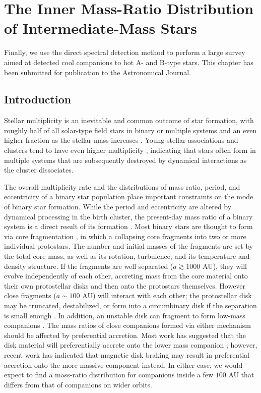 
\chapter{The Inner Mass-Ratio Distribution of Intermediate-Mass Stars}
\label{chap:survey}

Finally, we use the direct spectral detection method to perform a large survey aimed at detected cool companions to hot A- and B-type stars. This chapter has been submitted for publication to the Astronomical Journal.



\section{Introduction}
\label{paper6_sec:intro}

Stellar multiplicity is an inevitable and common outcome of star formation, with roughly half of all solar-type field stars in binary or multiple systems \citep{Raghavan2010} and an even higher fraction as the stellar mass increases \citep{Zinnecker2007}. Young stellar associations and clusters tend to have even higher multiplicity \citep{Duchene2013}, indicating that stars often form in multiple systems that are subsequently destroyed by dynamical interactions as the cluster dissociates. 

The overall multiplicity rate and the distributions of mass ratio, period, and eccentricity of a binary star population place important constraints on the mode of binary star formation. While the period and eccentricity are altered by dynamical processing in the birth cluster, the present-day mass ratio of a binary system is a direct result of its formation \citep{Parker2013}. Most binary stars are thought to form via core fragmentation \citep{Boss1979, Boss1986, Bate1995}, in which a collapsing core fragments into two or more individual protostars. The number and initial masses of the fragments are set by the total core mass, as well as its rotation, turbulence, and its temperature and density structure. If the fragments are well separated ($a \gtrsim 1000$ AU), they will evolve independently of each other, accreting mass from the core material onto their own protostellar disks and then onto the protostars themselves. However close fragments ($a \sim 100$ AU) will interact with each other; the protostellar disk may be truncated, destabilized, or form into a circumbinary disk if the separation is small enough \citep{Bate1997}. In addition, an unstable disk can fragment to form low-mass companions \citep{Kratter2006, Stamatellos2011}. The mass ratios of close companions formed via either mechanism should be affected by preferential accretion. Most work has suggested that the disk material will preferentially accrete onto the lower mass companion \citep{Bate1997, BBB2002}; however, recent work has indicated that magnetic disk braking may result in preferential accretion onto the more massive component \citep{Zhao2013} instead. In either case, we would expect to find a mass-ratio distribution for companions inside a few $100$ AU that differs from that of companions on wider orbits.

